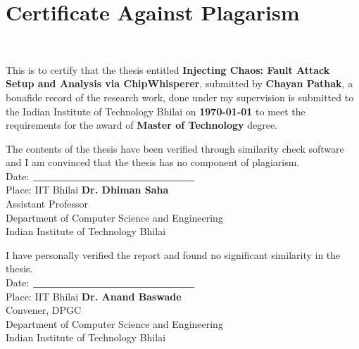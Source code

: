 \chapter[Approval]{Certificate Against Plagarism}

\hspace{0pt plus 1filll} \\
  
 \begin{Spacing}{1}
 	\sffamily
 	
\noindent 	
This is to certify that the thesis entitled \textbf{Injecting Chaos: Fault Attack Setup and Analysis via ChipWhisperer}, submitted by \textbf{Chayan Pathak}, a bonafide record of the research work, done under my supervision is submitted to the Indian Institute of Technology Bhilai on {\bfseries \today} to meet the requirements for the award of {\bfseries Master of Technology} degree.

The contents of the thesis have been verified through similarity check software and I am convinced that the thesis has no component of plagiarism.\\

\vspace{3em}
\noindent
Date: \hspace{0pt plus 1filll} $\underline{\hspace{5.8cm}}$\\
Place: IIT Bhilai \hspace{0pt plus 1filll} \textbf{Dr. Dhiman Saha}\\
\hspace*{0pt plus 1filll} Assistant Professor\\
\hspace*{0pt plus 1filll} Department of Computer Science and Engineering\\
\hspace*{0pt plus 1filll} Indian Institute of Technology Bhilai



\vspace{4em}
I have personally verified the report and found no significant similarity in the thesis.\\

\vspace{3em}
\noindent
Date: \hspace{0pt plus 1filll} $\underline{\hspace{5.8cm}}$\\
Place: IIT Bhilai \hspace{0pt plus 1filll} \textbf{Dr. Anand Baswade}\\
\hspace*{0pt plus 1filll} Convener, DPGC\\
\hspace*{0pt plus 1filll} Department of Computer Science and Engineering\\
\hspace*{0pt plus 1filll} Indian Institute of Technology Bhilai

\end{Spacing}